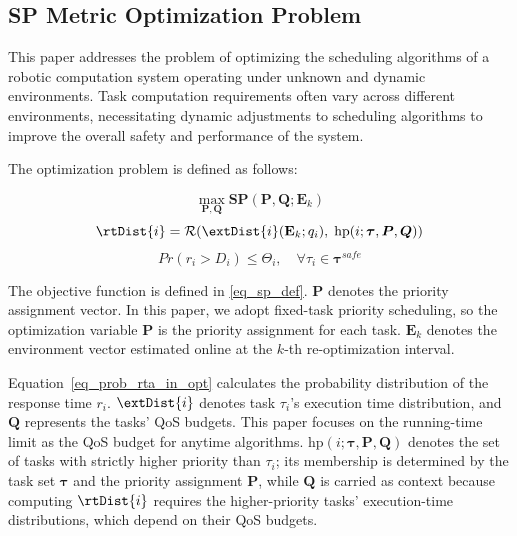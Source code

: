 	\subsection{SP Metric Optimization Problem}
    This paper addresses the problem of optimizing the scheduling algorithms of a robotic computation system operating under unknown and dynamic environments.
    Task computation requirements often vary across different environments, necessitating dynamic adjustments to scheduling algorithms to improve the overall safety and performance of the system.


    The optimization problem is defined as follows:

	\begin{equation}
		\max_{\boldsymbol{P}, \boldsymbol{Q}}  \textbf{SP}(\boldsymbol{P}, \boldsymbol{Q}; \textbf{E}_k)
		\label{eq_overall_obj}
	\end{equation}
	\begin{equation}
		\rtDist{i} = \mathcal{R}\!\left(\extDist{i}(\textbf{E}_k;q_i),\; \text{hp}(i;\boldsymbol{\tau},\boldsymbol{P},\boldsymbol{Q})\right)
		\label{eq_prob_rta_in_opt}
	\end{equation}
	\begin{equation}
		Pr(r_i > D_i) \leq \Theta_i, \quad \forall \tau_i \in \boldsymbol{\tau}^{safe}
		\label{eq_important_task_constraint}
	\end{equation}

        The objective function is defined in \eqref{eq_sp_def}.
        $\boldsymbol{P}$ denotes the priority assignment vector.
        In this paper, we adopt fixed-task priority scheduling, so the optimization variable $\boldsymbol{P}$ is the priority assignment for each task.
        $\textbf{E}_k$ denotes the environment vector estimated online at the $k$-th re-optimization interval.

        Equation~\eqref{eq_prob_rta_in_opt} calculates the probability distribution of the response time $r_i$.
        $\extDist{i}$ denotes task $\tau_i$'s execution time distribution, and $\boldsymbol{Q}$ represents the tasks' QoS budgets.
        This paper focuses on the running-time limit as the QoS budget for anytime algorithms.
        $\text{hp}(i;\boldsymbol{\tau},\boldsymbol{P},\boldsymbol{Q})$ denotes the set of tasks with strictly higher priority than $\tau_i$; its membership is determined by the task set $\boldsymbol{\tau}$ and the priority assignment $\boldsymbol{P}$, while $\boldsymbol{Q}$ is carried as context because computing $\rtDist{i}$ requires the higher-priority tasks' execution-time distributions, which depend on their QoS budgets.

